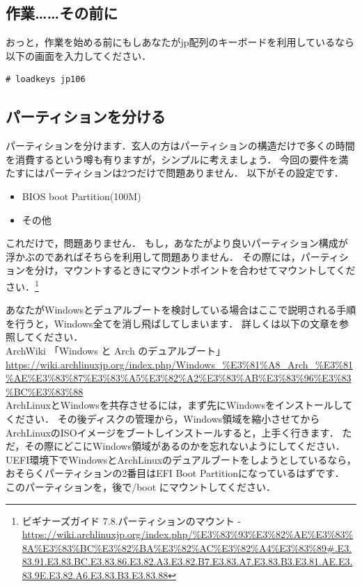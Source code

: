 \documentclass[b5j,twoside,openany]{jsbook}
\begin{document}
    \subsection{作業……その前に}
      おっと，作業を始める前にもしあなたがjp配列のキーボードを利用しているなら以下の画面を入力してください．
      \begin{screen}
\begin{verbatim}
# loadkeys jp106
\end{verbatim}
      \end{screen}

    \subsection{パーティションを分ける}
    \label{sub:パーティションを分ける}
      パーティションを分けます．玄人の方はパーティションの構造だけで多くの時間を消費するという噂も有りますが，シンプルに考えましょう．
      今回の要件を満たすにはパーティションは2つだけで問題ありません．
      以下がその設定です．
      \begin{itemize}
        \item BIOS boot Partition(100M)
        \item その他
      \end{itemize}
      これだけで，問題ありません．
      もし，あなたがより良いパーティション構成が浮かぶのであればそちらを利用して問題ありません．
      その際には，パーティションを分け，マウントするときにマウントポイントを合わせてマウントしてください．\footnote{ビギナーズガイド 7.8.パーティションのマウント - \url{https://wiki.archlinuxjp.org/index.php/%E3%83%93%E3%82%AE%E3%83%8A%E3%83%BC%E3%82%BA%E3%82%AC%E3%82%A4%E3%83%89#.E3.83.91.E3.83.BC.E3.83.86.E3.82.A3.E3.82.B7.E3.83.A7.E3.83.B3.E3.81.AE.E3.83.9E.E3.82.A6.E3.83.B3.E3.83.88}}
      
      \begin{boxnote}
        あなたがWindowsとデュアルブートを検討している場合はここで説明される手順を行うと，Windows全てを消し飛ばしてしまいます．
        詳しくは以下の文章を参照してください．\\

        ArchWiki 「Windows と Arch のデュアルブート」\\ \url{https://wiki.archlinuxjp.org/index.php/Windows_%E3%81%A8_Arch_%E3%81%AE%E3%83%87%E3%83%A5%E3%82%A2%E3%83%AB%E3%83%96%E3%83%BC%E3%83%88} \\

        ArchLinuxとWindowsを共存させるには，まず先にWindowsをインストールしてください．
        その後ディスクの管理から，Windows領域を縮小させてからArchLinuxのISOイメージをブートしインストールすると，上手く行きます．
        ただ，その際にどこにWindows領域があるのかを忘れないようにしてください．
        UEFI環境下でWindowsとArchLinuxのデュアルブートをしようとしているなら，おそらくパーティションの2番目はEFI Boot Partitionになっているはずです．
        このパーティションを，後で/boot にマウントしてください．
      \end{boxnote}
      
\end{document}
